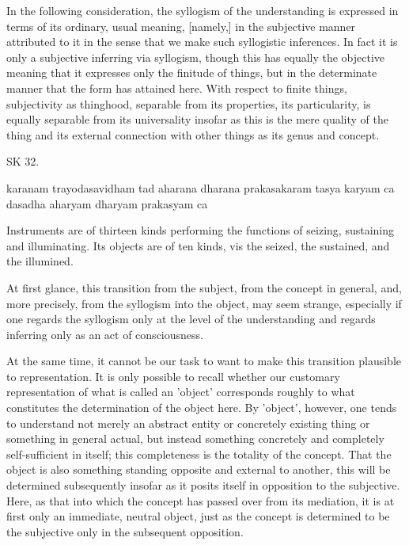 In the following consideration, the syllogism of the understanding
is expressed in terms of its ordinary, usual meaning, [namely,] in
the subjective manner attributed to it in the sense that
we make such syllogistic inferences.
In fact it is only a subjective inferring via syllogism,
though this has equally the objective meaning that
it expresses only the finitude of things,
but in the determinate manner that the form has attained here.
With respect to finite things, subjectivity as thinghood,
separable from its properties, its particularity, is
equally separable from its universality insofar as this is
the mere quality of the thing and its external connection with
other things as its genus and concept.

SK 32.

karanam trayodasavidham tad aharana dharana prakasakaram
tasya karyam ca dasadha aharyam dharyam prakasyam ca

Instruments are of thirteen kinds performing the functions of
seizing, sustaining and illuminating.
Its objects are of ten kinds, vis
the seized, the sustained, and the illumined.

At first glance, this transition from the subject,
from the concept in general, and, more precisely,
from the syllogism into the object,
may seem strange, especially if one
regards the syllogism only at the level of the understanding and
regards inferring only as an act of consciousness.

At the same time, it cannot be our task to want
to make this transition plausible to representation.
It is only possible to recall whether our customary representation
of what is called an 'object' corresponds roughly to
what constitutes the determination of the object here.
By 'object', however, one tends to understand not merely
an abstract entity or concretely existing thing or
something in general actual, but instead something
concretely and completely self-sufficient in itself;
this completeness is the totality of the concept.
That the object is also something standing
opposite and external to another,
this will be determined subsequently insofar as
it posits itself in opposition to the subjective.
Here, as that into which the concept has passed over from its mediation,
it is at first only an immediate, neutral object,
just as the concept is determined to be the subjective
only in the subsequent opposition.

